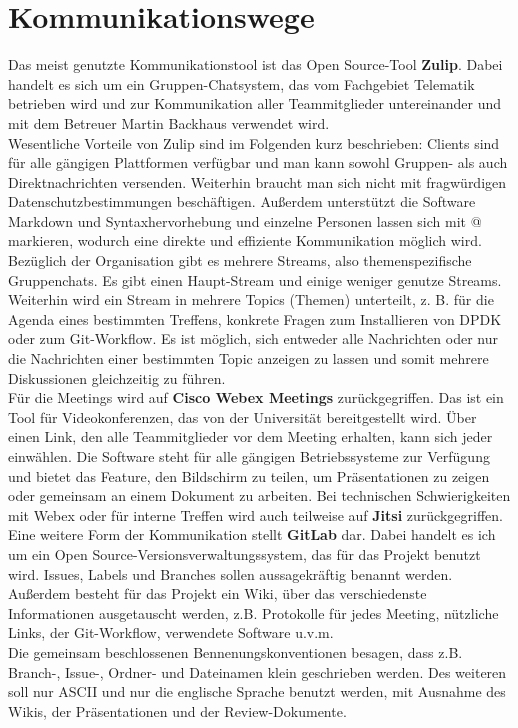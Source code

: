 \documentclass[../review_1.tex]{subfiles}
\begin{document}
\section{Kommunikationswege}
Das meist genutzte Kommunikationstool ist das Open Source-Tool \textbf{Zulip}. Dabei handelt es sich um ein Gruppen-Chatsystem, das vom Fachgebiet Telematik betrieben wird und zur Kommunikation aller Teammitglieder untereinander und mit dem Betreuer Martin Backhaus verwendet wird.\\
Wesentliche Vorteile von Zulip sind im Folgenden kurz beschrieben: Clients sind für alle gängigen Plattformen verfügbar und man kann sowohl Gruppen- als auch Direktnachrichten versenden. Weiterhin braucht man sich nicht mit fragwürdigen Datenschutzbestimmungen beschäftigen. Außerdem unterstützt die Software Markdown und Syntaxhervorhebung und einzelne Personen lassen sich mit \glqq @\grqq{} markieren, wodurch eine direkte und effiziente Kommunikation möglich wird.\\
Bezüglich der Organisation gibt es mehrere Streams, also themenspezifische Gruppenchats. Es gibt einen Haupt-Stream und einige weniger genutze Streams. Weiterhin wird ein Stream in mehrere Topics (Themen) unterteilt, z. B. für die Agenda eines bestimmten Treffens, konkrete Fragen zum Installieren von DPDK oder zum Git-Workflow. Es ist möglich, sich entweder alle Nachrichten oder nur die Nachrichten einer bestimmten Topic anzeigen zu lassen und somit mehrere Diskussionen gleichzeitig zu führen.\\
Für die Meetings wird auf \textbf{Cisco Webex Meetings} zurückgegriffen. Das ist ein Tool für Videokonferenzen, das von der Universität bereitgestellt wird. Über einen Link, den alle Teammitglieder vor dem Meeting erhalten, kann sich jeder einwählen. Die Software steht für alle gängigen Betriebssysteme zur Verfügung und bietet das Feature, den Bildschirm zu teilen, um Präsentationen zu zeigen oder gemeinsam an einem Dokument zu arbeiten. Bei technischen Schwierigkeiten mit Webex oder für interne Treffen wird auch teilweise auf \textbf{Jitsi} zurückgegriffen.\\
Eine weitere Form der Kommunikation stellt \textbf{GitLab} dar. Dabei handelt es ich um ein Open Source-Versionsverwaltungssystem, das für das Projekt benutzt wird. Issues, Labels und Branches sollen aussagekräftig benannt werden. Außerdem besteht für das Projekt ein Wiki, über das verschiedenste Informationen ausgetauscht werden, z.B. Protokolle für jedes Meeting, nützliche Links, der Git-Workflow, verwendete Software u.v.m.\\
Die gemeinsam beschlossenen Bennenungskonventionen besagen, dass z.B. Branch-, Issue-, Ordner- und Dateinamen klein geschrieben werden. Des weiteren soll nur ASCII und nur die englische Sprache benutzt werden, mit Ausnahme des Wikis, der Präsentationen und der Review-Dokumente.
\end{document}
